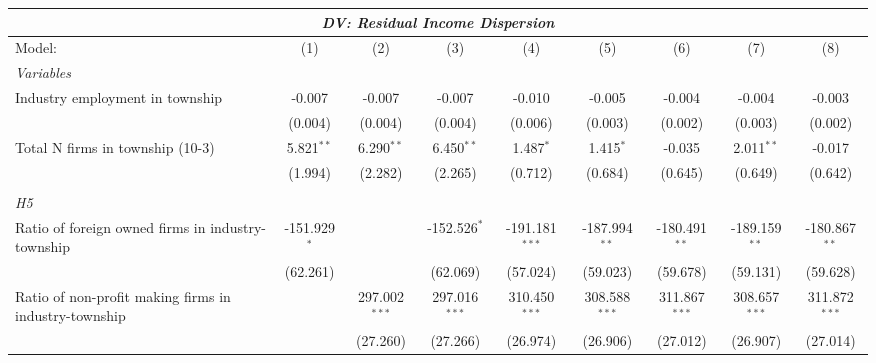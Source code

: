 \begingroup
\centering
\begin{tabular}{lcccccccc}
   \tabularnewline \multicolumn{9}{c}{\textit{DV: Residual Income Dispersion}} \\ \midrule \midrule
   Model:                                                & (1)            & (2)             & (3)             & (4)              & (5)             & (6)             & (7)             & (8)\\  
   \midrule
   \emph{Variables}\\
   Industry employment in township                       & -0.007         & -0.007          & -0.007          & -0.010           & -0.005          & -0.004          & -0.004          & -0.003\\   
                                                         & (0.004)        & (0.004)         & (0.004)         & (0.006)          & (0.003)         & (0.002)         & (0.003)         & (0.002)\\   
   Total N firms in township (10-3)                      & 5.821$^{**}$   & 6.290$^{**}$    & 6.450$^{**}$    & 1.487$^{*}$      & 1.415$^{*}$     & -0.035          & 2.011$^{**}$    & -0.017\\   
                                                         & (1.994)        & (2.282)         & (2.265)         & (0.712)          & (0.684)         & (0.645)         & (0.649)         & (0.642)\\   
\hdashline %
\\[0.1ex] %
\emph{H5} \\ 
   Ratio of foreign owned firms in industry-township     & -151.929$^{*}$ &                 & -152.526$^{*}$  & -191.181$^{***}$ & -187.994$^{**}$ & -180.491$^{**}$ & -189.159$^{**}$ & -180.867$^{**}$\\   
                                                         & (62.261)       &                 & (62.069)        & (57.024)         & (59.023)        & (59.678)        & (59.131)        & (59.628)\\   
   Ratio of non-profit making firms in industry-township &                & 297.002$^{***}$ & 297.016$^{***}$ & 310.450$^{***}$  & 308.588$^{***}$ & 311.867$^{***}$ & 308.657$^{***}$ & 311.872$^{***}$\\   
                                                         &                & (27.260)        & (27.266)        & (26.974)         & (26.906)        & (27.012)        & (26.907)        & (27.014)\\   

\end{tabular}
